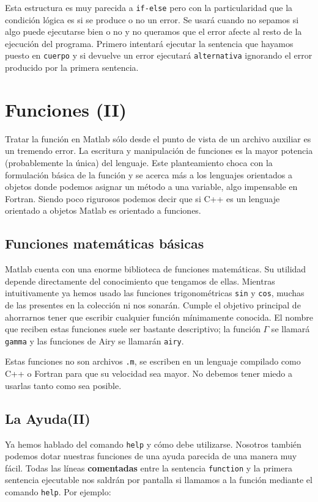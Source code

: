 Esta estructura es muy parecida a \texttt{if-else} pero con la
particularidad que la condición lógica es si se produce o no un error.
Se usará cuando no sepamos si algo puede ejecutarse bien o no y no
queramos que el error afecte al resto de la ejecución del programa.
Primero intentará ejecutar la sentencia que hayamos puesto en
\texttt{cuerpo} y si devuelve un error ejecutará \texttt{alternativa}
ignorando el error producido por la primera sentencia.


\section{Funciones (II)}

Tratar la función en Matlab sólo desde el punto de vista de un archivo
auxiliar es un tremendo error. La escritura y manipulación de
funciones es la mayor potencia (probablemente la única) del lenguaje.
Este planteamiento choca con la formulación básica de la función y se
acerca más a los lenguajes orientados a objetos donde podemos asignar
un método a una variable, algo impensable en Fortran. Siendo poco
rigurosos podemos decir que si C++ es un lenguaje orientado a objetos
Matlab es orientado a funciones.


\subsection{Funciones matemáticas básicas}

Matlab cuenta con una enorme biblioteca de funciones matemáticas.  Su
utilidad depende directamente del conocimiento que tengamos de ellas.
Mientras intuitivamente ya hemos usado las funciones trigonométricas
\texttt{sin} y \texttt{cos}, muchas de las presentes en la colección
ni nos sonarán. Cumple el objetivo principal de ahorrarnos tener que
escribir cualquier función mínimamente conocida. El nombre que reciben
estas funciones suele ser bastante descriptivo; la función $\Gamma$ se
llamará \texttt{gamma} y las funciones de Airy se llamarán
\texttt{airy}.

Estas funciones no son archivos \texttt{.m}, se escriben en un
lenguaje compilado como C++ o Fortran para que su velocidad sea mayor.
No debemos tener miedo a usarlas tanto como sea posible.


\subsection{La Ayuda(II)}

Ya hemos hablado del comando \texttt{help} y cómo debe
utilizarse. Nosotros también podemos dotar nuestras funciones de una
ayuda parecida de una manera muy fácil. Todas las líneas
\textbf{comentadas} entre la sentencia \texttt{function} y la primera
sentencia ejecutable nos saldrán por pantalla si llamamos a la función
mediante el comando \texttt{help}. Por ejemplo:

